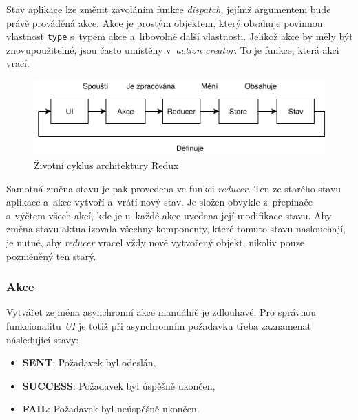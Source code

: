 \documentclass[a4paper,12pt]{article}
\def\code#1{\texttt{#1}}
\begin{document}
Stav aplikace lze změnit zavoláním funkce \textit{dispatch}, jejímž argumentem bude právě prováděná akce. Akce je prostým objektem, který obsahuje povinnou vlastnost \code{type} s~typem akce a~libovolné další vlastnosti. Jelikož akce by měly být znovupoužitelné, jsou často umístěny v~\textit{action creator}. To je funkce, která akci vrací.

\begin{figure}[H]
\begin{center}
\includegraphics[width=350pt]{Images/Redux.png}
\caption[Životní cyklus architektury Redux]{Životní cyklus architektury Redux \footnotemark}
\label{BodiesList}
\end{center}
\end{figure}


Samotná změna stavu je pak provedena ve funkci \textit{reducer}. Ten ze starého stavu aplikace a~akce vytvoří a~vrátí nový stav. Je složen obvykle z~přepínače s~výčtem všech akcí, kde je u~každé akce uvedena její modifikace stavu. Aby změna stavu aktualizovala všechny komponenty, které tomuto stavu naslouchají, je nutné, aby \textit{reducer} vracel vždy nově vytvořený objekt, nikoliv pouze pozměněný ten starý.



\subsubsection{Akce}

Vytvářet zejména asynchronní akce manuálně je zdlouhavé. Pro správnou funkcionalitu \textit{UI} je totiž při asynchronním požadavku třeba zaznamenat následující stavy:

\begin{itemize}
\item \textbf{SENT}: Požadavek byl odeslán,
\item \textbf{SUCCESS}: Požadavek byl úspěšně ukončen,
\item \textbf{FAIL}: Požadavek byl neúspěšně ukončen.
\end{itemize}
\end{document}
